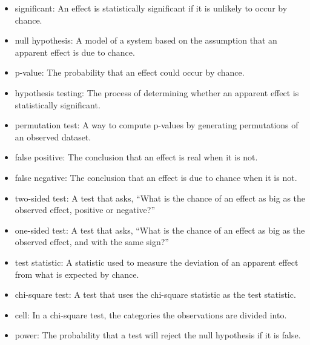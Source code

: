 \documentclass[12pt]{book}
\begin{document}
\begin{itemize}

\item significant: An effect is statistically significant if it is unlikely
to occur by chance.

\item null hypothesis: A model of a system based on the assumption that
an apparent effect is due to chance.

\item p-value: The probability that an effect could occur by chance.

\item hypothesis testing: The process of determining whether an apparent
effect is statistically significant.

\item permutation test: A way to compute p-values by generating
  permutations of an observed dataset.

\item false positive: The conclusion that an effect is real when it is not.

\item false negative: The conclusion that an effect is due to chance when it
is not.

\item two-sided test: A test that asks, ``What is the chance of an effect
as big as the observed effect, positive or negative?''

\item one-sided test: A test that asks, ``What is the chance of an effect
as big as the observed effect, and with the same sign?''

\item test statistic: A statistic used to measure the deviation of an
apparent effect from what is expected by chance.

\item chi-square test: A test that uses the chi-square statistic as
the test statistic.

\item cell: In a chi-square test, the categories the observations are
divided into.

\item power: The probability that a test will reject the null hypothesis
if it is false.

\end{itemize}
\end{document}
